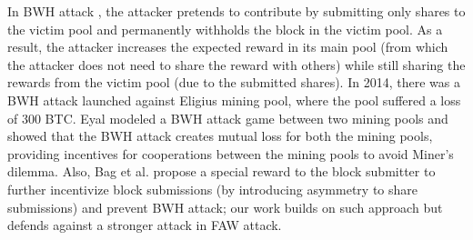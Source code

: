 In BWH attack \cite{b2}, the attacker pretends to contribute by submitting only shares to the victim pool
and permanently withholds the block in the victim pool.
As a result, the attacker increases the expected reward in its main pool (from which the attacker does not need to share the reward with others) while still sharing the rewards from the victim pool (due to the submitted shares).
In 2014, there was a BWH attack launched against Eligius mining pool, where the pool suffered a loss of 300 BTC.
Eyal \cite{b5} modeled a BWH attack game between two mining pools and showed that the BWH attack creates mutual loss for both the mining pools, providing incentives for cooperations between the mining pools to avoid Miner's dilemma. Also, Bag et al. \cite{b3} propose a special reward to the block submitter to further incentivize block submissions (by introducing asymmetry to share submissions) and prevent BWH attack;
our work builds on such approach but defends against a stronger attack in FAW attack. 